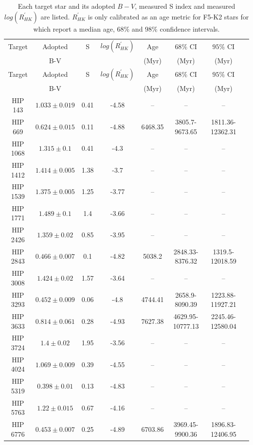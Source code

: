 \begin{longtable}{|c|c|c|c|c|c|c|c|}
\caption{Each target star and its adopted $B-V$, measured S index and measured $log(R^{'}_{HK})$ are listed. $R^{'}_{HK}$ is only calibrated as an age metric for F5-K2 stars for which report a median age, $68\%$ and $98\%$ confidence intervals.}\\


\hline
Target & Adopted  & S & $log(R^{'}_{HK})$ & Age  & $68\%$ CI& $95\%$ CI \\
 & B-V& & & (Myr)  & (Myr) & (Myr)  \\
\hline
\endfirsthead 
\hline
Target & Adopted  & S & $log(R^{'}_{HK})$ & Age  & $68\%$ CI& $95\%$ CI \\
 & B-V& & & (Myr)  & (Myr) & (Myr)  \\
\hline
\endhead
\hline
\endfoot
\hline
\endlastfoot
HIP 143 & $ 1.033 \pm 0.019 $ & 0.41 & -4.58 &-- &-- &-- \\
HIP 669 & $ 0.624 \pm 0.015 $ & 0.11 & -4.88 & 6468.35 & 3805.7-9673.65 & 1811.36-12362.31 \\
HIP 1068 & $ 1.315 \pm 0.1 $ & 0.41 & -4.3 &-- &-- &-- \\
HIP 1412 & $ 1.414 \pm 0.005 $ & 1.38 & -3.7 &-- &-- &-- \\
HIP 1539 & $ 1.375 \pm 0.005 $ & 1.25 & -3.77 &-- &-- &-- \\
HIP 1771 & $ 1.489 \pm 0.1 $ & 1.4 & -3.66 &-- &-- &-- \\
HIP 2426 & $ 1.359 \pm 0.02 $ & 0.85 & -3.95 &-- &-- &-- \\
HIP 2843 & $ 0.466 \pm 0.007 $ & 0.1 & -4.82 & 5038.2 & 2848.33-8376.32 & 1319.5-12018.59 \\
HIP 3008 & $ 1.424 \pm 0.02 $ & 1.57 & -3.64 &-- &-- &-- \\
HIP 3293 & $ 0.452 \pm 0.009 $ & 0.06 & -4.8 & 4744.41 & 2658.9-8090.39 & 1223.88-11927.21 \\
HIP 3633 & $ 0.814 \pm 0.061 $ & 0.28 & -4.93 & 7627.38 & 4629.95-10777.13 & 2245.46-12580.04 \\
HIP 3724 & $ 1.4 \pm 0.02 $ & 1.95 & -3.56 &-- &-- &-- \\
HIP 4024 & $ 1.069 \pm 0.009 $ & 0.39 & -4.55 &-- &-- &-- \\
HIP 5319 & $ 0.398 \pm 0.01 $ & 0.13 & -4.83 &-- &-- &-- \\
HIP 5763 & $ 1.22 \pm 0.015 $ & 0.67 & -4.16 &-- &-- &-- \\
HIP 6776 & $ 0.453 \pm 0.007 $ & 0.25 & -4.89 & 6703.86 & 3969.45-9900.36 & 1896.83-12406.95 \\

\end{longtable}
